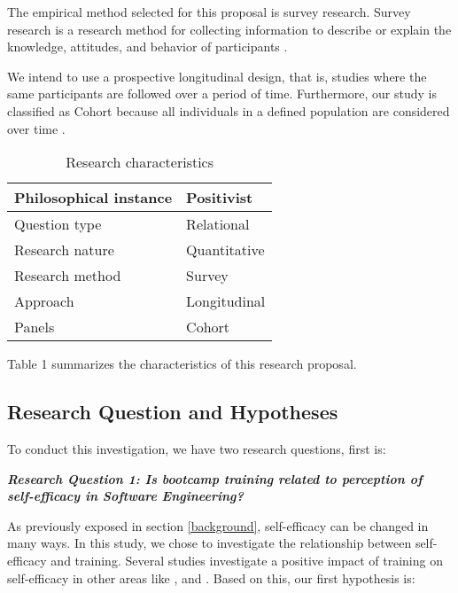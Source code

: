 \documentclass[10pt, conference]{IEEEtran}
\begin{document}
The empirical method selected for this proposal is survey research. Survey research is a research method for collecting information to describe or explain the knowledge, attitudes, and behavior of participants \cite{easterbrook2008selecting}. 

We intend to use a prospective longitudinal design, that is, studies where the same participants are followed over a period of time. Furthermore, our study is classified as Cohort because all individuals in a defined population are considered over time \cite{caruana2015longitudinal}.


\begin{table}[h]
\centering
\caption{Research characteristics}
\begin{tabular}{ll}
\hline
Philosophical instance & Positivist   \\ \hline
Question type          & Relational \\ \hline
Research nature        & Quantitative \\ \hline
Research method        & Survey       \\ \hline
Approach               & Longitudinal   \\ \hline
Panels                 & Cohort   \\ \hline
\end{tabular}
\end{table}

Table 1 summarizes the characteristics of this research proposal.

\subsection{Research Question and Hypotheses }

To conduct this investigation, we have two research questions, first is:
 \newline

\textbf{\textit{Research Question 1: Is bootcamp training related to perception of self-efficacy in Software Engineering?}}
 \newline
 
As previously exposed in section \ref{background}, self-efficacy can be changed in many ways. In this study, we chose to investigate the relationship between self-efficacy and training. Several studies investigate a positive impact of training on self-efficacy in other areas like \cite{gist1989effects}, \cite{gist1989influence} and \cite{tannenbaum1991meeting}. Based on this, our first hypothesis is:
 \newline
   
\end{document}
